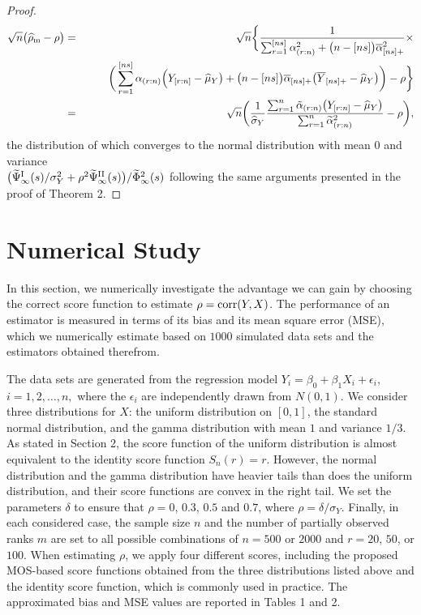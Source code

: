 \documentclass[12pt]{article}
\begin{document}
\begin{proof} 
\begin{eqnarray}
\sqrt{n} \big( \widehat{\rho}_{\rm m} - \rho \big) &=& 
\sqrt{n} \bigg\{\frac{1}{\sum_{r=1}^{[ns]} \alpha_{(r:n)}^2 + \big(n-[ns]\big) \overline{\alpha}_{[ns]+}^2}\times
 \nonumber\\
&& \qquad \bigg( \sum_{r=1}^{[ns]} \alpha_{(r:n)} \Big( Y_{[r:n]} - \widehat{\mu}_Y \big)+\big(n-[ns] 
\big) \overline{\alpha}_{[ns]+} \big(\overline{Y}_{[ns]+}-\widehat{\mu}_Y \big) \bigg)-\rho\bigg\} \nonumber\\
&=& \sqrt{n} \bigg(\frac{1}{\widehat{\sigma}_Y} \frac{\sum_{r=1}^n \tilde{\alpha}_{(r:n)} \big( Y_{[r:n]} -
 \widehat{\mu}_Y \big)} {\sum_{r=1}^n \widetilde{\alpha}_{(r:n)}^2}-\rho\bigg), \nonumber 
\end{eqnarray}
the distribution of which converges to the normal distribution with mean $0$ and variance \\
$\big(\widetilde{\Psi}_{\infty}^{\rm I}(s)/\sigma_Y^2+\rho^2\widetilde{\Psi}_{\infty}^{\rm II}(s)\big)/\widetilde{\Phi}_{\infty}^2(s)$
following the same arguments presented in the proof of Theorem 2. 
\end{proof} 




\section{Numerical Study}

In this section, we numerically investigate the advantage 
we can gain by choosing the correct score function to estimate 
$\rho={\rm corr} (Y,X)$. The performance of an estimator is 
measured in terms of its bias and its mean square error (MSE), which 
we numerically estimate based on 
$1000$ simulated data sets and the estimators obtained therefrom. 


The data sets are generated from the regression model 
$Y_i = \beta_0 + \beta_1 X_i + \epsilon_i,$ $i=1,2,\ldots,n,$ where the $\epsilon_i$ are
independently drawn from $N(0,1)$. We consider three distributions for $X$: 
the uniform distribution on $[0,1]$, the standard normal distribution, and the gamma 
distribution with mean $1$ and variance $1/3$.  As stated in Section 2, the score function of 
the uniform distribution is almost equivalent to the identity score function $S_n(r)=r$. However, the normal distribution and the gamma distribution have 
heavier tails than does the uniform distribution, and their score functions are convex in the right 
tail. We set the parameters $\delta$ to ensure that $\rho = 0$, $0.3$, $0.5$ and $0.7$, where
 $\rho=\delta/\sigma_Y$. Finally, in each considered case, the sample size $n$ and 
the number of partially observed ranks $m$ are set to all possible combinations of 
 $n = 500$ or $2000$ and $r=20$, $50$, or $100$.
When estimating $\rho$, we apply
four different scores, including the proposed MOS-based score functions
obtained from the three distributions listed above and the identity score function, which is commonly used in practice. The approximated bias and MSE values are reported in Tables 1 and 2.
\end{document}
